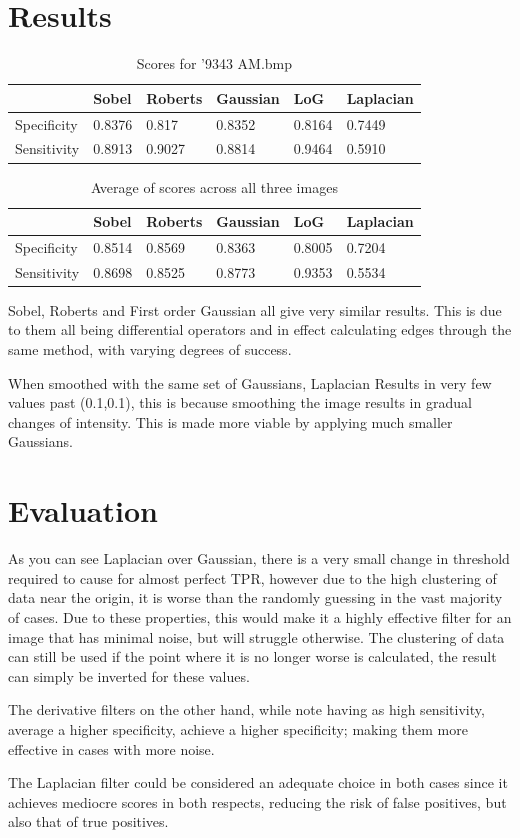 \documentclass{Resources/UoBLab1}
\begin{document}
\section{Results}
\begin{table}[h]
\begin{tabular}{llllll}
\hline
            & Sobel  & Roberts & Gaussian  & LoG    & Laplacian \\
      \hline
Specificity & 0.8376 & 0.817   & 0.8352    & 0.8164 & 0.7449    \\
Sensitivity & 0.8913 & 0.9027  & 0.8814    & 0.9464 & 0.5910    \\
\hline
\end{tabular}
\caption{Scores for '9343 AM.bmp}
\label{tab:img1}
\end{table}

\begin{table}[]
\begin{tabular}{llllll}
\hline
            & Sobel  & Roberts & Gaussian & LoG    & Laplacian \\ \hline
Specificity & 0.8514 & 0.8569  & 0.8363   & 0.8005 & 0.7204    \\
Sensitivity   & 0.8698 & 0.8525  & 0.8773   & 0.9353 & 0.5534    \\ \hline
\end{tabular}
\caption{Average of scores across all three images}
\label{tab:avr}
\end{table}
Sobel,  Roberts and First order Gaussian all give very similar results. This is due to them all being differential operators and in effect calculating edges through the same method, with varying degrees of success.\par
When smoothed with the same set of Gaussians, Laplacian Results in very few values past (0.1,0.1), this is because smoothing the image results in gradual changes of intensity. This is made more viable by applying much smaller Gaussians.

\section{Evaluation}
As you can see Laplacian over Gaussian, there is a very small change in threshold required to cause for almost perfect TPR, however due to the high clustering of data near the origin, it is worse than the randomly guessing in the vast majority of cases. 
Due to these properties, this would make it a highly effective filter for an image that has minimal noise, but will struggle otherwise.
The clustering of data can still be used if the point where it is no longer worse is calculated, the result can simply be inverted for these values.\par
The derivative filters on the other hand, while note having as high sensitivity, average a higher specificity, achieve a higher specificity; making them more effective in cases with more noise.\par
The Laplacian filter could be considered an adequate choice in both cases since it achieves mediocre scores in both respects, reducing the risk of false positives, but also that of true positives.
\end{document}
